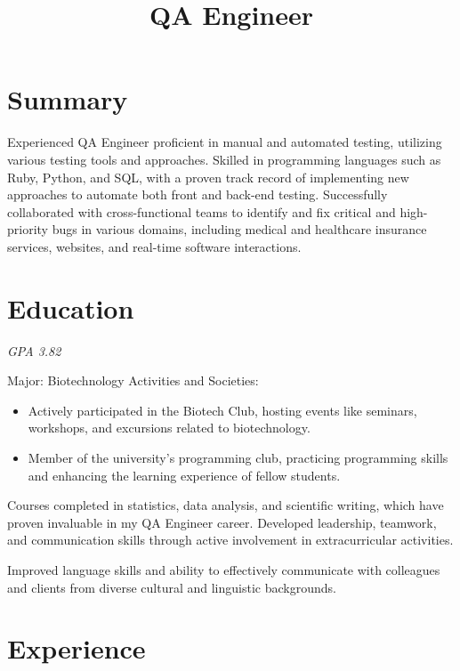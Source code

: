 \documentclass[11pt,a4paper,sans]{moderncv}
\title{QA Engineer}
\begin{document}
\makecvtitle

\section{Summary}
Experienced QA Engineer proficient in manual and automated testing, utilizing various testing tools and approaches. Skilled in programming languages such as Ruby, Python, and SQL, with a proven track record of implementing new approaches to automate both front and back-end testing. Successfully collaborated with cross-functional teams to identify and fix critical and high-priority bugs in various domains, including medical and healthcare insurance services, websites, and real-time software interactions.

\section{Education}
{\textit{GPA 3.82}}
{Major: Biotechnology\newline{}
Activities and Societies:
\begin{itemize}
\item Actively participated in the Biotech Club, hosting events like seminars, workshops, and excursions related to biotechnology.
\item Member of the university's programming club, practicing programming skills and enhancing the learning experience of fellow students.
\end{itemize}
Courses completed in statistics, data analysis, and scientific writing, which have proven invaluable in my QA Engineer career. Developed leadership, teamwork, and communication skills through active involvement in extracurricular activities.}

{Improved language skills and ability to effectively communicate with colleagues and clients from diverse cultural and linguistic backgrounds.}

\section{Experience}
\end{document}
